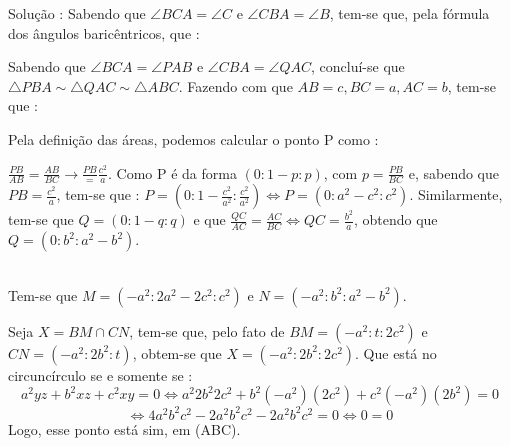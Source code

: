 \documentclass{article}
\begin{document}
\begin{center}
\end{center}

Solução : Sabendo que $\angle BCA = \angle C$ e $\angle CBA = \angle B$, tem-se que, pela fórmula dos ângulos baricêntricos, que : 

Sabendo que $\angle BCA = \angle PAB$ e $\angle CBA = \angle QAC$, concluí-se que $\bigtriangleup PBA \sim \bigtriangleup QAC \sim \bigtriangleup ABC$. Fazendo com que $AB = c, BC = a, AC = b$, tem-se que :

Pela definição das áreas, podemos calcular  o ponto P como : 

$\frac{PB}{AB} = \frac{AB}{BC} \rightarrow \frac{PB} = \frac{c^2}{a}$. Como P é da forma $(0 : 1-p: p)$, com $p = \frac{PB}{BC}$ e, sabendo que $PB = \frac{c^2}{a}$, tem-se que : $P = (0 : 1 - \frac{c^2}{a^2} : \frac{c^2}{a^2}) \iff P = (0: a^2-c^2 : c^2)$. Similarmente, tem-se que $Q = (0 : 1-q : q)$ e que $\frac{QC}{AC} = \frac{AC}{BC} \iff QC = \frac{b^2}{a}$, obtendo que $Q = (0 : b^2 : a^2 - b^2)$.

\\

Tem-se que $M = (-a^2 : 2a^2-2c^2 : c^2)$ e $N = (-a^2 : b^2 : a^2 - b^2)$.

Seja $X = BM \cap CN$, tem-se que, pelo fato de $BM = (-a^2 : t : 2c^2)$ e $CN = (-a^2 : 2b^2 : t)$, obtem-se que $X = (-a^2 :  2b^2 : 2c^2)$. Que está no circuncírculo se e somente se : 
$$
a^2yz + b^2xz + c^2xy = 0
\iff
a^2 2b^2 2c^2 + b^2 (-a^2)(2c^2) + c^2 (-a^2)(2b^2) = 0
$$
$$
\iff
4a^2b^2c^2 - 2a^2b^2c^2 - 2a^2b^2c^2 = 0
\iff
0 = 0
$$
Logo, esse ponto está sim, em (ABC).
\pagebreak 
\end{document}
